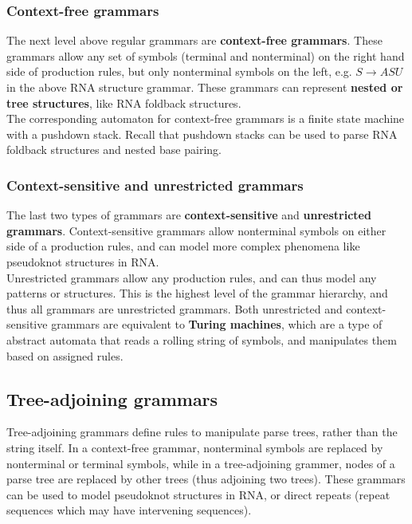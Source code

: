 \documentclass[12pt]{article}
\begin{document}
\subsubsection{Context-free grammars}
The next level above regular grammars are \textbf{context-free grammars}. These grammars allow any set of symbols (terminal and nonterminal) on the right hand side of production rules, but only nonterminal symbols on the left, e.g. $S \rightarrow ASU$ in the above RNA structure grammar. These grammars can represent \textbf{nested or tree structures}, like RNA foldback structures.\\[10pt]
The corresponding automaton for context-free grammars is a finite state machine with a pushdown stack. Recall that pushdown stacks can be used to parse RNA foldback structures and nested base pairing.

\subsubsection{Context-sensitive and unrestricted grammars}
The last two types of grammars are \textbf{context-sensitive} and \textbf{unrestricted grammars}. Context-sensitive grammars allow nonterminal symbols on either side of a production rules, and can model more complex phenomena like pseudoknot structures in RNA.\\[10pt]
Unrestricted grammars allow any production rules, and can thus model any patterns or structures. This is the highest level of the grammar hierarchy, and thus all grammars are unrestricted grammars. Both unrestricted and context-sensitive grammars are equivalent to \textbf{Turing machines}, which are a type of abstract automata that reads a rolling string of symbols, and manipulates them based on assigned rules.

\subsection{Tree-adjoining grammars}
Tree-adjoining grammars define rules to manipulate parse trees, rather than the string itself. In a context-free grammar, nonterminal symbols are replaced by nonterminal or terminal symbols, while in a tree-adjoining grammer, nodes of a parse tree are replaced by other trees (thus adjoining two trees). These grammars can be used to model pseudoknot structures in RNA, or direct repeats (repeat sequences which may have intervening sequences).
\end{document}
